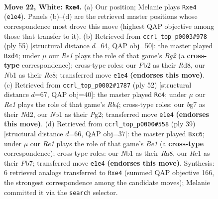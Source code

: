 \documentclass[11pt]{article}
\begin{document}
\clearpage

\begin{figure}[p]\centering
\begin{subfigure}{0.46\textwidth}\centering
\resizebox{\linewidth}{!}{%
\newchessgame
\chessboard[
  setfen={rn1r4/5kb1/2p1p3/8/p3nB1p/P7/RPP2PPP/1N2RK2 w - - 0 22},
  showmover=false,
  pgfstyle=straightmove, color=movearrow, markmove={e1-e4}
]}
\caption{}
\end{subfigure}\hfill
\begin{subfigure}{0.46\textwidth}\centering
\resizebox{\linewidth}{!}{%
\newchessgame
\chessboard[
  setfen={3rr1k1/1p3pb1/2pp4/P1n3p1/P1PN4/6PP/5PB1/1R1R2K1 b - - 2 28},
  showmover=false,
  pgfstyle=straightmove, color=movearrow, markmove={g7-d4}
]}
\caption{}
\end{subfigure}
\\[4pt]
\begin{subfigure}{0.46\textwidth}\centering
\resizebox{\linewidth}{!}{%
\newchessgame
\chessboard[
  setfen={2r3k1/6pp/1p1p4/rP6/pR1P4/P1n5/3N1PPP/4R1K1 w - - 6 27},
  showmover=false,
  pgfstyle=straightmove, color=movearrow, markmove={b4-c4}
]}
\caption{}
\end{subfigure}\hfill
\begin{subfigure}{0.46\textwidth}\centering
\resizebox{\linewidth}{!}{%
\newchessgame
\chessboard[
  setfen={r1r1bk2/1p3ppp/2NRp3/pB2P3/5P2/2P5/1KP3PP/7R b - - 0 20},
  showmover=false,
  pgfstyle=straightmove, color=movearrow, markmove={e8-c6}
]}
\caption{}
\end{subfigure}
\caption{\textbf{Move 22, White: \texttt{Rxe4}.} (a) Our position; Melanie plays \texttt{Rxe4} (\texttt{e1e4}). Panels (b)--(d) are the retrieved master positions whose correspondence most drove this move (highest QAP objective among those that transfer to it). (b) Retrieved from \texttt{ccrl\_top\_p0003\#978} (ply 55) [structural distance $d$=64, QAP obj=50]: the master played \texttt{Bxd4}; under $\mu$ our \emph{Re1} plays the role of that game's \emph{Bg2} (a \textbf{cross-type} correspondence); cross-type roles: our \emph{P}b2 as their \emph{R}d8, our \emph{N}b1 as their \emph{R}e8; transferred move \texttt{e1e4} \textbf{(endorses this move)}. (c) Retrieved from \texttt{ccrl\_top\_p0002\#1787} (ply 52) [structural distance $d$=67, QAP obj=40]: the master played \texttt{Rc4}; under $\mu$ our \emph{Re1} plays the role of that game's \emph{Rb4}; cross-type roles: our \emph{b}g7 as their \emph{N}d2, our \emph{N}b1 as their \emph{P}g2; transferred move \texttt{e1e4} \textbf{(endorses this move)}. (d) Retrieved from \texttt{ccrl\_top\_p0000\#558} (ply 39) [structural distance $d$=66, QAP obj=37]: the master played \texttt{Bxc6}; under $\mu$ our \emph{Re1} plays the role of that game's \emph{Be1} (a \textbf{cross-type} correspondence); cross-type roles: our \emph{N}b1 as their \emph{R}a8, our \emph{R}e1 as their \emph{P}b7; transferred move \texttt{e1e4} \textbf{(endorses this move)}. Synthesis: 6 retrieved analogs transferred to \texttt{Rxe4} (summed QAP objective 166, the strongest correspondence among the candidate moves); Melanie committed it via the \texttt{search} selector.}
\label{fig:thought-m42}
\end{figure}
\end{document}
